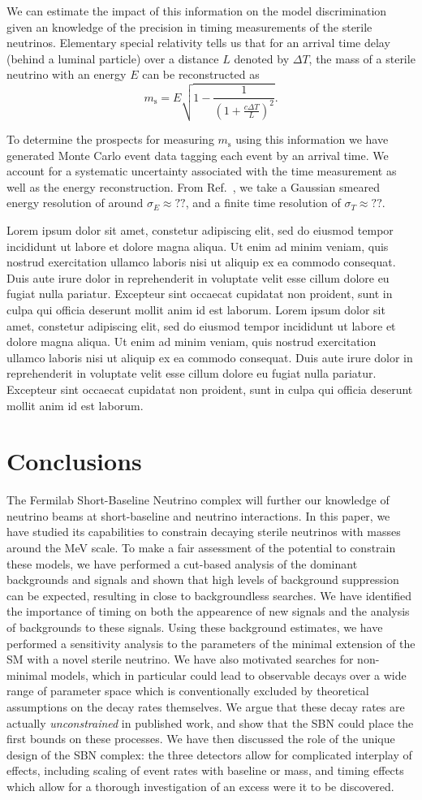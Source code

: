 \documentclass[11pt, a4paper]{article}
\newcommand{\refref}[1]{Ref.~\cite{#1}}
\newcommand{\lorem}{ \textcolor[rgb]{0.8,0.8,0.8}{Lorem ipsum dolor sit amet, constetur
adipiscing elit, sed do eiusmod tempor incididunt ut labore et dolore magna
aliqua. Ut enim ad minim veniam, quis nostrud exercitation ullamco laboris nisi
ut aliquip ex ea commodo consequat. Duis aute irure dolor in reprehenderit in
voluptate velit esse cillum dolore eu fugiat nulla pariatur. Excepteur sint
occaecat cupidatat non proident, sunt in culpa qui officia deserunt mollit anim
id est laborum.}}
\begin{document}
We can estimate the impact of this information on the model discrimination
given an knowledge of the precision in timing measurements of the sterile
neutrinos. Elementary special relativity tells us that for an arrival time delay (behind a luminal particle) over a distance $L$ denoted by $\Delta T$, the mass of a sterile neutrino with an energy $E$ can be reconstructed as 
%
%
\[ m_\text{s} = E\sqrt{1-\frac{1}{\left(1+\frac{c\Delta T}{L}\right)^2}}. \]

To determine the prospects for measuring $m_\text{s}$ using this information we
have generated Monte Carlo event data tagging each event by an arrival time.
We account for a systematic uncertainty associated with the time measurement as
well as the energy reconstruction. From \refref{WHERE}, we take a Gaussian
smeared energy resolution of around $\sigma_E \approx ??$, and a finite time
resolution of $\sigma_T  \approx ??$.

\lorem\lorem

\section{Conclusions}

The Fermilab Short-Baseline Neutrino complex will further our knowledge of
neutrino beams at short-baseline and neutrino interactions. In this paper, we
have studied its capabilities to constrain decaying sterile neutrinos with
masses around the MeV scale. To make a fair assessment of the potential to
constrain these models, we have performed a cut-based analysis of the dominant
backgrounds and signals and shown that high levels of background suppression
can be expected, resulting in close to backgroundless searches. We have
identified the importance of timing on both the appearence of new signals and
the analysis of backgrounds to these signals. Using these background estimates,
we have performed a sensitivity analysis to the parameters of the minimal
extension of the SM with a novel sterile neutrino. We have also motivated
searches for non-minimal models, which in particular could lead to observable
decays over a wide range of parameter space which is conventionally excluded by
theoretical assumptions on the decay rates themselves. We argue that these
decay rates are actually \emph{unconstrained} in published work, and show that
the SBN could place the first bounds on these processes. We have then discussed
the role of the unique design of the SBN complex: the three detectors allow for
complicated interplay of effects, including scaling of event rates with
baseline or mass, and timing effects which allow for a thorough investigation
of an excess were it to be discovered. 
\end{document}

